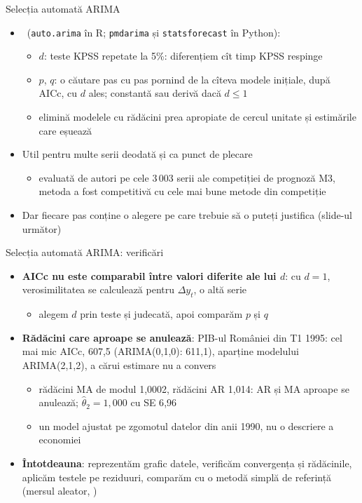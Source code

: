 \begin{frame}{Selecția automată ARIMA}
\itemsize{\small}
\begin{itemize}
    \item {}\ (\texttt{auto.arima} în R; \texttt{pmdarima} și \texttt{statsforecast} în Python):
    \begin{itemize}
        \item $d$: teste KPSS repetate la 5\%: diferențiem cît timp KPSS respinge
        \item $p$, $q$: o căutare pas cu pas pornind de la cîteva modele inițiale, după AICc, cu $d$ ales; constantă sau derivă dacă $d \le 1$
        \item elimină modelele cu rădăcini prea apropiate de cercul unitate și estimările care eșuează
    \end{itemize}
    \item Util pentru multe serii deodată și ca punct de plecare
    \begin{itemize}
        \item evaluată de autori pe cele 3\,003 serii ale competiției de prognoză M3, metoda a fost competitivă cu cele mai bune metode din competiție
    \end{itemize}
    \item Dar fiecare pas conține o alegere pe care trebuie să o puteți justifica (slide-ul următor)
\end{itemize}
\end{frame}

\begin{frame}{Selecția automată ARIMA: verificări}
\itemsize{\small}
\begin{itemize}
    \item \textbf{AICc nu este comparabil între valori diferite ale lui $d$}: cu $d = 1$, verosimilitatea se calculează pentru $\Delta y_t$, o altă serie
    \begin{itemize}
        \item alegem $d$ prin teste și judecată, apoi comparăm $p$ și $q$
    \end{itemize}
    \item \textbf{Rădăcini care aproape se anulează}: PIB-ul României din T1 1995: cel mai mic AICc, 607{,}5 (ARIMA(0,1,0): 611{,}1), aparține modelului ARIMA(2,1,2), a cărui estimare nu a convers
    \begin{itemize}
        \item rădăcini MA de modul 1{,}0002, rădăcini AR 1{,}014: AR și MA aproape se anulează; $\hat\theta_2 = 1{,}000$ cu SE 6{,}96
        \item un model ajustat pe zgomotul datelor din anii 1990, nu o descriere a economiei
    \end{itemize}
    \item \textbf{Întotdeauna}: reprezentăm grafic datele, verificăm convergența și rădăcinile, aplicăm testele pe reziduuri, comparăm cu o metodă simplă de referință (mersul aleator, )
\end{itemize}
\end{frame}

